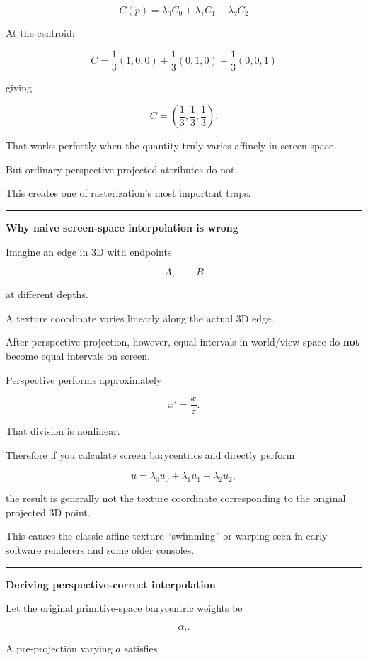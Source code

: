 \[
\boxed{
C(p)=
\lambda_0C_0+
\lambda_1C_1+
\lambda_2C_2
}
\]

At the centroid:

\[
C=
\frac13(1,0,0)
+
\frac13(0,1,0)
+
\frac13(0,0,1)
\]

giving

\[
C=
\left(
\frac13,\frac13,\frac13
\right).
\]

That works perfectly when the quantity truly varies affinely in screen space.

But ordinary perspective-projected attributes do not.

This creates one of rasterization's most important traps.

\begin{center}\rule{0.5\linewidth}{0.5pt}\end{center}

\textbf{Why naive screen-space interpolation is wrong}

Imagine an edge in 3D with endpoints

\[
A,\qquad B
\]

at different depths.

A texture coordinate varies linearly along the actual 3D edge.

After perspective projection, however, equal intervals in world/view space do \textbf{not} become equal intervals on screen.

Perspective performs approximately

\[
x'=\frac{x}{z}.
\]

That division is nonlinear.

Therefore if you calculate screen barycentrics and directly perform

\[
u=
\lambda_0u_0+
\lambda_1u_1+
\lambda_2u_2,
\]

the result is generally not the texture coordinate corresponding to the original projected 3D point.

This causes the classic affine-texture ``swimming'' or warping seen in early software renderers and some older consoles.

\begin{center}\rule{0.5\linewidth}{0.5pt}\end{center}

\textbf{Deriving perspective-correct interpolation}

Let the original primitive-space barycentric weights be

\[
\alpha_i.
\]

A pre-projection varying \(a\) satisfies

